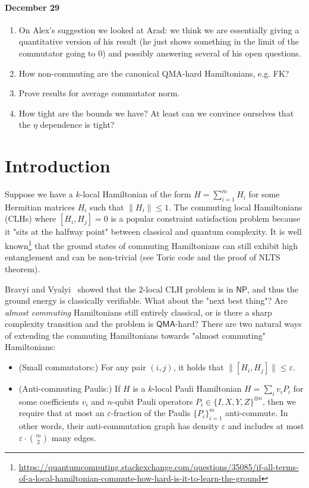 \documentclass[11pt]{article}
\theoremstyle{plain}
\newcommand{\eps}{\varepsilon}
\begin{document}
\paragraph{December 29}
\begin{enumerate}
    \item On Alex's suggestion we looked at Arad: we think we are essentially giving a quantitative version of his result (he just shows something in the limit of the commutator going to $0$) and possibly answering several of his open questions. 
    \item How non-commuting are the canonical QMA-hard Hamiltonians, e.g. FK?
    \item Prove results for average commutator norm.
    \item How tight are the bounds we have? At least can we convince ourselves that the $\eta$ dependence is tight?
\end{enumerate}

\newpage
\section{Introduction}

Suppose we have a $k$-local Hamiltonian of the form $H = \sum_{i=1}^m H_i$
for some Hermitian matrices $H_i$ such that $\| H_i \| \leq 1$. The
commuting local Hamiltonians
(CLHs) where $[H_i,H_j]=0$ is a popular constraint satisfaction problem because it "sits at the halfway point" between classical and quantum complexity. It is well known\footnote{\url{https://quantumcomputing.stackexchange.com/questions/35085/if-all-terms-of-a-local-hamiltonian-commute-how-hard-is-it-to-learn-the-ground}} that the ground states of commuting Hamiltonians can still exhibit high
entanglement and can be non-trivial (see Toric code and the proof of NLTS theorem).

Bravyi and Vyalyi~\cite{bravyi2004commutativeversionklocalhamiltonian} showed that the $2$-local CLH problem is in $\mathsf{NP}$, and thus the ground
energy is classically verifiable. What about the "next best thing"? Are \emph{almost commuting} Hamiltonians still entirely classical, or is there a sharp complexity transition and the problem is $\mathsf{QMA}$-hard? There are two natural ways of extending the commuting Hamiltonians towards "almost commuting" Hamiltonians:
\begin{itemize}
    \item (Small commutators:) For any pair $(i,j)$, it holds that $\|[H_i,H_j]\| \leq \eps$.

    \item (Anti-commuting Paulis:) If $H$ is a $k$-local Pauli Hamiltonian $H=\sum_i v_i P_i$ for some coefficients $v_i$ and $n$-qubit Pauli operators $P_i \in \{I,X,Y,Z\}^{\otimes n}$, then we require that at most an $\eps$-fraction of the Paulis $\{P_i\}_{i=1}^m$ anti-commute. In other words, their anti-commutation graph has density $\eps$ and includes at most $\eps \cdot \binom{m}{2}$ many edges.
\end{itemize}
\end{document}
